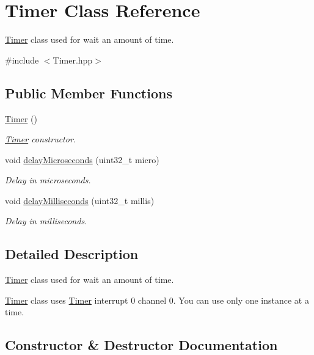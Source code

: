 \hypertarget{class_timer}{}\section{Timer Class Reference}
\label{class_timer}


\hyperlink{class_timer}{Timer} class used for wait an amount of time.  




{\ttfamily \#include $<$Timer.\+hpp$>$}

\subsection*{Public Member Functions}
\begin{DoxyCompactItemize}
\item 
\hyperlink{class_timer_a5f16e8da27d2a5a5242dead46de05d97}{Timer} ()
\begin{DoxyCompactList}\small\item\em \hyperlink{class_timer}{Timer} constructor. \end{DoxyCompactList}\item 
void \hyperlink{class_timer_ab0e4cd17c2beacc8013609ff00b8c84b}{delay\+Microseconds} (uint32\+\_\+t micro)
\begin{DoxyCompactList}\small\item\em Delay in microseconds. \end{DoxyCompactList}\item 
void \hyperlink{class_timer_a394b71189519df8fdf3f2318cf8971ef}{delay\+Milliseconds} (uint32\+\_\+t millis)
\begin{DoxyCompactList}\small\item\em Delay in milliseconds. \end{DoxyCompactList}\end{DoxyCompactItemize}


\subsection{Detailed Description}
\hyperlink{class_timer}{Timer} class used for wait an amount of time. 

\hyperlink{class_timer}{Timer} class uses \hyperlink{class_timer}{Timer} interrupt 0 channel 0. You can use only one instance at a time. 

\subsection{Constructor \& Destructor Documentation}
